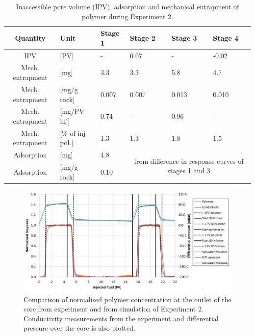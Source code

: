 \documentclass[journal = enfuem, manuscript =  article]{achemso}
\begin{document}
\begin{table} 
\small
\centering
\caption{Inaccessible pore volume (IPV), adsorption and mechanical entrapment of polymer during Experiment 2.}
\label{tab:ipvexp2}
\begin{tabular}{c l l l l l } 
\toprule
\textbf{Quantity} & \textbf{Unit} & \textbf{Stage 1} & \textbf{Stage 2} & \textbf{Stage 3} & \textbf{Stage 4} \\ 
\midrule 
IPV                & [PV]           & -         & 0.07     & -         & -0.02     \\
Mech. entrapment   & [mg]          & 3.3       & 3.3       & 5.8       & 4.7       \\ 
Mech. entrapment   & [mg/g rock]   & 0.007     & 0.007     & 0.013     & 0.010     \\ 
Mech. entrapment   & [mg/PV inj]   & 0.74      & -         & 0.96      & -         \\
Mech. entrapment   & [\% of inj pol.]& 1.3       & 1.3       & 1.8       & 1.5       \\ 
Adsorption         & [mg]          & 4.8       &   \multicolumn{3}{c}{\multirow{2}{15em}{from difference in response curves of stages 1 and 3}}        \\
Adsorption         & [mg/g rock]   & 0.10      &  \multicolumn{3}{c}{}    \\ 
\bottomrule
\end{tabular}
\end{table}

\begin{figure}[h]
    \centering
    \includegraphics[width=\textwidth]{fig/simExpNP2.png}
    \caption{Comparison of normalised polymer concentration at the outlet of the core from experiment and from simulation of Experiment 2. Conductivity measurements from the experiment and differential pressure over the core is also plotted.}
    \label{cht:simExpNP2}
\end{figure}
\end{document}
